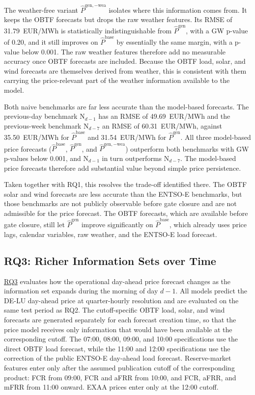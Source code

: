 The weather-free variant \(\hat{P}^{\mathrm{gen},-\mathrm{wea}}\) isolates where
this information comes from. It keeps the OBTF forecasts
but drops the raw weather features. Its RMSE of 31.79~EUR/MWh is statistically
indistinguishable from \(\hat{P}^{\mathrm{gen}}\), with a
GW p-value of 0.20, and it still improves on \(\hat{P}^{\mathrm{base}}\)
by essentially the same margin, with a p-value below 0.001. The raw weather features
therefore add no measurable accuracy once OBTF forecasts are included.
Because the OBTF load, solar, and wind forecasts are themselves derived
from weather, this is consistent with them carrying the price-relevant part of
the weather information available to the model.

Both naive benchmarks are far less accurate than the model-based forecasts. The
previous-day benchmark \(\mathrm{N}_{d-1}\) has an RMSE of 49.69~EUR/MWh and the
previous-week benchmark \(\mathrm{N}_{d-7}\) an RMSE of 60.31~EUR/MWh, against
35.50~EUR/MWh for \(\hat{P}^{\mathrm{base}}\) and 31.54~EUR/MWh for
\(\hat{P}^{\mathrm{gen}}\). All three model-based price forecasts
(\(\hat{P}^{\mathrm{base}}\), \(\hat{P}^{\mathrm{gen}}\), and
\(\hat{P}^{\mathrm{gen},-\mathrm{wea}}\)) outperform both benchmarks with
GW p-values below 0.001, and \(\mathrm{N}_{d-1}\) in turn
outperforms \(\mathrm{N}_{d-7}\). The model-based price forecasts therefore add
substantial value beyond simple price persistence.

Taken together with RQ1, this resolves the trade-off identified there. The OBTF solar and wind forecasts are less accurate than the \mbox{ENTSO-E}
benchmarks, but those benchmarks are not publicly
observable before gate closure and are not admissible for the price forecast. The OBTF
forecasts, which are available before gate closure, still let
\(\hat{P}^{\mathrm{gen}}\) improve significantly on \(\hat{P}^{\mathrm{base}}\),
which already uses price lags, calendar variables, raw weather, and the
\mbox{ENTSO-E} load forecast.

\subsection{RQ3: Richer Information Sets over Time}
\label{sec:results_rq3}

\hyperlink{rq:cutoff_sensitivity}{RQ3} evaluates how the operational
day-ahead price forecast changes as the information set expands during the
morning of day \(d-1\). All models predict the \mbox{DE-LU} day-ahead price at
quarter-hourly resolution and are evaluated on the same test period as RQ2. The cutoff-specific OBTF load, solar, and wind forecasts are generated
separately for each forecast creation time, so that the price model receives
only information that would have been available at the corresponding cutoff.
The 07:00, 08:00, 09:00, and 10:00 specifications use the direct OBTF
load forecast, while the 11:00 and 12:00 specifications use the correction of
the public \mbox{ENTSO-E} day-ahead load forecast. Reserve-market
features enter only after the assumed publication cutoff of the corresponding
product: FCR from 09:00, FCR and aFRR from 10:00, and FCR, aFRR, and mFRR from
11:00 onward. EXAA prices enter only at the 12:00 cutoff.

